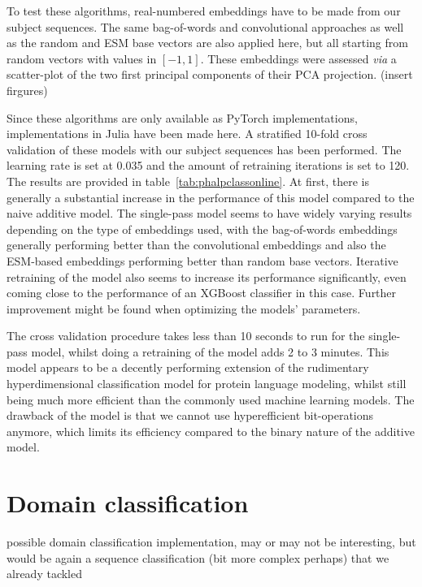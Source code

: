 To test these algorithms, real-numbered embeddings have to be made from our subject sequences. The same bag-of-words and convolutional approaches as well as the random and ESM base vectors are also applied here, but all starting from random vectors with values in $[-1, 1]$. These embeddings were assessed \textit{via} a scatter-plot of the two first principal components of their PCA projection. (insert firgures)

Since these algorithms are only available as PyTorch implementations, implementations in Julia have been made here. A stratified 10-fold cross validation of these models with our subject sequences has been performed. The learning rate is set at 0.035 and the amount of retraining iterations is set to 120. The results are provided in table~\ref{tab:phalpclassonline}. At first, there is generally a substantial increase in the performance of this model compared to the naive additive model. The single-pass model seems to have widely varying results depending on the type of embeddings used, with the bag-of-words embeddings generally performing better than the convolutional embeddings and also the ESM-based embeddings performing better than random base vectors. Iterative retraining of the model also seems to increase its performance significantly, even coming close to the performance of an XGBoost classifier in this case. Further improvement might be found when optimizing the models' parameters.

The cross validation procedure takes less than 10 seconds to run for the single-pass model, whilst doing a retraining of the model adds 2 to 3 minutes. This model appears to be a decently performing extension of the rudimentary hyperdimensional classification model for protein language modeling, whilst still being much more efficient than the commonly used machine learning models. The drawback of the model is that we cannot use hyperefficient bit-operations anymore, which limits its efficiency compared to the binary nature of the additive model.

\begin{table}[h]
    \caption{\label{tab:phalpclassonline}Results of type classifications using implementations of OnlineHD with several kinds of embeddings}
\end{table}

\section{Domain classification}
possible domain classification implementation, may or may not be interesting, but would be again a sequence classification (bit more complex perhaps) that we already tackled 